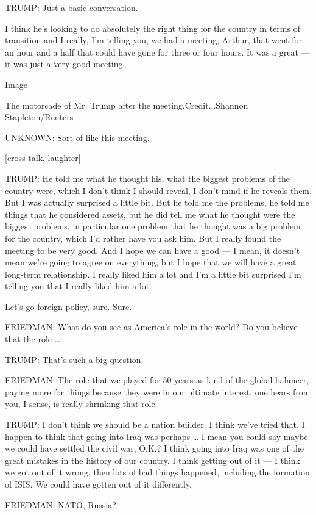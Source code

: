 TRUMP: Just a basic conversation.

I think he's looking to do absolutely the right thing for the country in
terms of transition and I really, I'm telling you, we had a meeting,
Arthur, that went for an hour and a half that could have gone for three
or four hours. It was a great --- it was just a very good meeting.

Image

The motorcade of Mr. Trump after the meeting.Credit...Shannon
Stapleton/Reuters

UNKNOWN: Sort of like this meeting.

{[}cross talk, laughter{]}

TRUMP: He told me what he thought his, what the biggest problems of the
country were, which I don't think I should reveal, I don't mind if he
reveals them. But I was actually surprised a little bit. But he told me
the problems, he told me things that he considered assets, but he did
tell me what he thought were the biggest problems, in particular one
problem that he thought was a big problem for the country, which I'd
rather have you ask him. But I really found the meeting to be very good.
And I hope we can have a good --- I mean, it doesn't mean we're going to
agree on everything, but I hope that we will have a great long-term
relationship. I really liked him a lot and I'm a little bit surprised
I'm telling you that I really liked him a lot.

Let's go foreign policy, sure. Sure.

FRIEDMAN: What do you see as America's role in the world? Do you believe
that the role \ldots{}

TRUMP: That's such a big question.

FRIEDMAN: The role that we played for 50 years as kind of the global
balancer, paying more for things because they were in our ultimate
interest, one hears from you, I sense, is really shrinking that role.

TRUMP: I don't think we should be a nation builder. I think we've tried
that. I happen to think that going into Iraq was perhaps \ldots{} I mean
you could say maybe we could have settled the civil war, O.K.? I think
going into Iraq was one of the great mistakes in the history of our
country. I think getting out of it --- I think we got out of it wrong,
then lots of bad things happened, including the formation of ISIS. We
could have gotten out of it differently.

FRIEDMAN: NATO, Russia?


